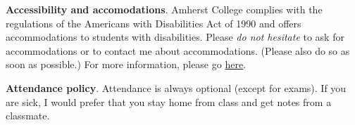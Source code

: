 \documentclass[12pt]{article}
\begin{document}
\bigskip

\noindent\textbf{Accessibility and accomodations}.
Amherst College complies with the regulations of the Americans with Disabilities Act of 1990 and offers accommodations to students with disabilities. Please \emph{do not hesitate} to ask for accommodations or to contact me about accommodations. (Please also do so as soon as possible.) For more information, please go \href{https://www.amherst.edu/offices/student-affairs/accessibility-services}{here}.

\bigskip
\noindent \textbf{Attendance policy}. Attendance is always optional (except for exams).
If you are sick, I would prefer that you stay home from class and get notes from a classmate.

\end{document}
